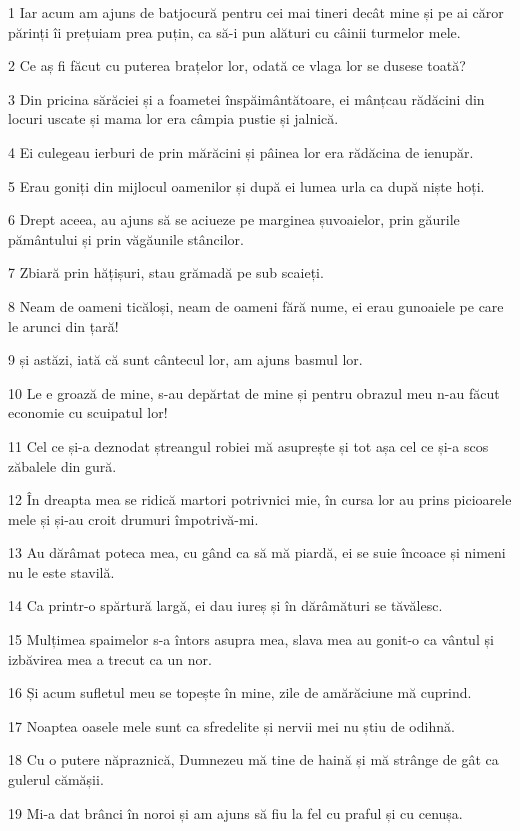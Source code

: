 \par 1 Iar acum am ajuns de batjocură pentru cei mai tineri decât mine și pe ai căror părinți îi prețuiam prea puțin, ca să-i pun alături cu câinii turmelor mele.
\par 2 Ce aș fi făcut cu puterea brațelor lor, odată ce vlaga lor se dusese toată?
\par 3 Din pricina sărăciei și a foametei înspăimântătoare, ei mânțcau rădăcini din locuri uscate și mama lor era câmpia pustie și jalnică.
\par 4 Ei culegeau ierburi de prin mărăcini și pâinea lor era rădăcina de ienupăr.
\par 5 Erau goniți din mijlocul oamenilor și după ei lumea urla ca după niște hoți.
\par 6 Drept aceea, au ajuns să se aciueze pe marginea șuvoaielor, prin găurile pământului și prin văgăunile stâncilor.
\par 7 Zbiară prin hățișuri, stau grămadă pe sub scaieți.
\par 8 Neam de oameni ticăloși, neam de oameni fără nume, ei erau gunoaiele pe care le arunci din țară!
\par 9 și astăzi, iată că sunt cântecul lor, am ajuns basmul lor.
\par 10 Le e groază de mine, s-au depărtat de mine și pentru obrazul meu n-au făcut economie cu scuipatul lor!
\par 11 Cel ce și-a deznodat ștreangul robiei mă asuprește și tot așa cel ce și-a scos zăbalele din gură.
\par 12 În dreapta mea se ridică martori potrivnici mie, în cursa lor au prins picioarele mele și și-au croit drumuri împotrivă-mi.
\par 13 Au dărâmat poteca mea, cu gând ca să mă piardă, ei se suie încoace și nimeni nu le este stavilă.
\par 14 Ca printr-o spărtură largă, ei dau iureș și în dărâmături se tăvălesc.
\par 15 Mulțimea spaimelor s-a întors asupra mea, slava mea au gonit-o ca vântul și izbăvirea mea a trecut ca un nor.
\par 16 Și acum sufletul meu se topește în mine, zile de amărăciune mă cuprind.
\par 17 Noaptea oasele mele sunt ca sfredelite și nervii mei nu știu de odihnă.
\par 18 Cu o putere năpraznică, Dumnezeu mă tine de haină și mă strânge de gât ca gulerul cămășii.
\par 19 Mi-a dat brânci în noroi și am ajuns să fiu la fel cu praful și cu cenușa.
